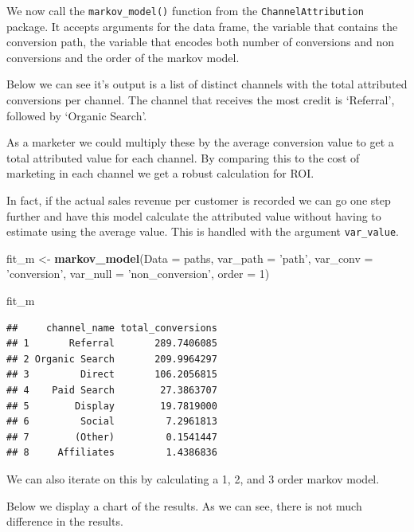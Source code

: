 \documentclass[]{book}
\newenvironment{Shaded}{\begin{snugshade}}{\end{snugshade}}
\newcommand{\DataTypeTok}[1]{\textcolor[rgb]{0.13,0.29,0.53}{#1}}
\newcommand{\DecValTok}[1]{\textcolor[rgb]{0.00,0.00,0.81}{#1}}
\newcommand{\KeywordTok}[1]{\textcolor[rgb]{0.13,0.29,0.53}{\textbf{#1}}}
\newcommand{\NormalTok}[1]{#1}
\newcommand{\StringTok}[1]{\textcolor[rgb]{0.31,0.60,0.02}{#1}}
\begin{document}
We now call the \texttt{markov\_model()} function from the \texttt{ChannelAttribution} package. It accepts
arguments for the data frame, the variable that contains the conversion path,
the variable that encodes both number of conversions and non conversions and the
order of the markov model.

Below we can see it's output is a list of distinct channels with the total
attributed conversions per channel. The channel that receives the most
credit is `Referral', followed by `Organic Search'.

As a marketer we could multiply these by the average conversion value to get
a total attributed value for each channel. By comparing this to the cost of
marketing in each channel we get a robust calculation for ROI.

In fact, if the actual sales revenue per customer is recorded we can go
one step further and have this model calculate the attributed value without
having to estimate using the average value. This is handled with the argument
\texttt{var\_value}.

\begin{Shaded}
\begin{Highlighting}[]
\NormalTok{fit_m <-}\StringTok{ }\KeywordTok{markov_model}\NormalTok{(}\DataTypeTok{Data =}\NormalTok{ paths, }
                      \DataTypeTok{var_path =} \StringTok{'path'}\NormalTok{, }
                      \DataTypeTok{var_conv =} \StringTok{'conversion'}\NormalTok{, }
                      \DataTypeTok{var_null =} \StringTok{'non_conversion'}\NormalTok{, }
                      \DataTypeTok{order =} \DecValTok{1}\NormalTok{)}

\NormalTok{fit_m}
\end{Highlighting}
\end{Shaded}

\begin{verbatim}
##     channel_name total_conversions
## 1       Referral       289.7406085
## 2 Organic Search       209.9964297
## 3         Direct       106.2056815
## 4    Paid Search        27.3863707
## 5        Display        19.7819000
## 6         Social         7.2961813
## 7        (Other)         0.1541447
## 8     Affiliates         1.4386836
\end{verbatim}

We can also iterate on this by calculating a 1, 2, and 3 order markov model.

Below we display a chart of the results. As we can see, there is not much
difference in the results.
\end{document}
